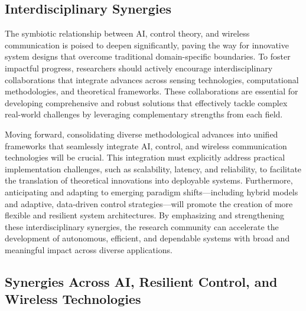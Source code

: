\documentclass[sigconf]{acmart}
\begin{document}
\subsection{Interdisciplinary Synergies}

The symbiotic relationship between AI, control theory, and wireless communication is poised to deepen significantly, paving the way for innovative system designs that overcome traditional domain-specific boundaries. To foster impactful progress, researchers should actively encourage interdisciplinary collaborations that integrate advances across sensing technologies, computational methodologies, and theoretical frameworks. These collaborations are essential for developing comprehensive and robust solutions that effectively tackle complex real-world challenges by leveraging complementary strengths from each field.

Moving forward, consolidating diverse methodological advances into unified frameworks that seamlessly integrate AI, control, and wireless communication technologies will be crucial. This integration must explicitly address practical implementation challenges, such as scalability, latency, and reliability, to facilitate the translation of theoretical innovations into deployable systems. Furthermore, anticipating and adapting to emerging paradigm shifts—including hybrid models and adaptive, data-driven control strategies—will promote the creation of more flexible and resilient system architectures. By emphasizing and strengthening these interdisciplinary synergies, the research community can accelerate the development of autonomous, efficient, and dependable systems with broad and meaningful impact across diverse applications.

\subsection{Synergies Across AI, Resilient Control, and Wireless Technologies}
\end{document}
